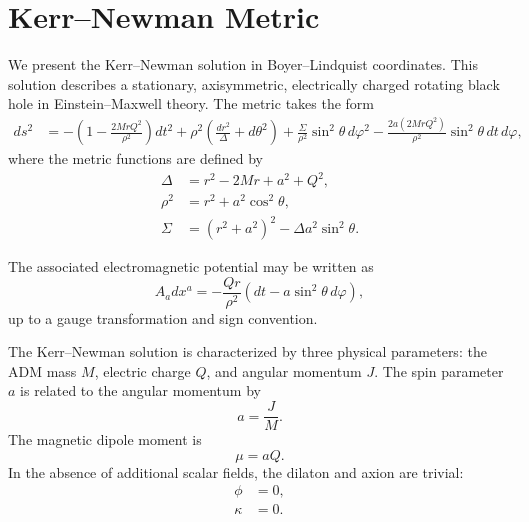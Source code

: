 \section{Kerr--Newman Metric}
\label{sec:appx:KerrNewmanBH}

We present the Kerr--Newman solution in Boyer--Lindquist coordinates. This solution describes a stationary, axisymmetric, electrically charged rotating black hole in Einstein--Maxwell theory. The metric takes the form
\begin{align}
ds^2 &=
-\left(1-\frac{2Mr Q^2}{\rho^2}\right)dt^2
+\rho^2\left(\frac{dr^2}{\Delta}+d\theta^2\right)
+\frac{\Sigma}{\rho^2}\sin^2\theta\,d\varphi^2
-\frac{2a(2Mr Q^2)}{\rho^2}\sin^2\theta\,dt\,d\varphi ,
\end{align}
where the metric functions are defined by
\begin{align}
\Delta &= r^2 - 2Mr + a^2 + Q^2, \\
\rho^2 &= r^2 + a^2\cos^2\theta, \\
\Sigma &= \left(r^2+a^2\right)^2-\Delta a^2\sin^2\theta .
\end{align}

The associated electromagnetic potential may be written as
\begin{equation}
A_a dx^a =
-\frac{Qr}{\rho^2}
\left(dt - a\sin^2\theta\,d\varphi\right),
\end{equation}
up to a gauge transformation and sign convention.

The Kerr--Newman solution is characterized by three physical parameters: the ADM mass \(M\), electric charge \(Q\), and angular momentum \(J\). The spin parameter \(a\) is related to the angular momentum by
\begin{equation}
a = \frac{J}{M}.
\end{equation}
The magnetic dipole moment is
\begin{equation}
\mu = aQ.
\end{equation}
In the absence of additional scalar fields, the dilaton and axion are trivial:
\begin{align}
\phi &= 0, \\
\kappa &= 0 .
\end{align}

